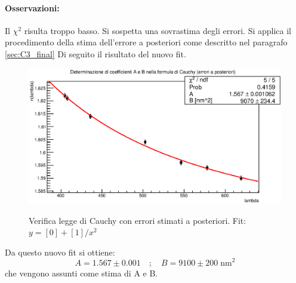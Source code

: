 \paragraph{Osservazioni:}{ Il $\chi^2$ risulta troppo basso. Si sospetta una sovrastima degli errori. Si applica il procedimento della stima dell'errore a posteriori come descritto nel paragrafo \ref{sec:C3_final}
Di seguito il risultato del nuovo fit.

    \begin{figure}[H]
    \centering
    \includegraphics[scale=0.8]{Grafici/O3_P2_1_AB_p.eps}
    \label{fig:C3_P2_RL}
    \caption{Verifica legge di Cauchy con errori stimati a posteriori. Fit: $y = [0] + [1]/x^{2}$  }
    \end{figure}
%
%
Da questo nuovo fit si ottiene:
$$ A = 1.567 \pm 0.001 \quad ; \quad B = 9100 \pm 200 \;\mathrm{ nm^{2}} $$
che vengono assunti come stima di A e B.    
}  
